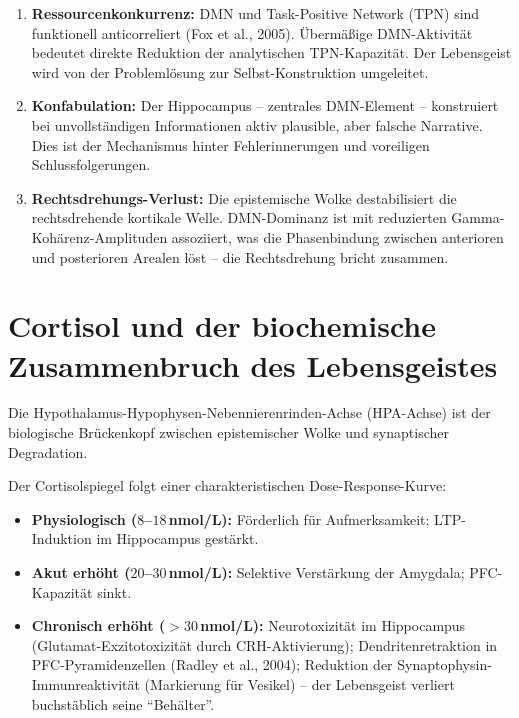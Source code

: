 ﻿\documentclass[12pt,a4paper]{report}
\theoremstyle{plain}
\theoremstyle{definition}
\theoremstyle{remark}
\begin{document}
	\begin{enumerate}[label=\arabic*., leftmargin=1.6cm]
		\item \textbf{Ressourcenkonkurrenz:} DMN und Task-Positive Network (TPN)
		sind funktionell anticorreliert (Fox et al., 2005).
		Übermä\ss{}ige DMN-Aktivität bedeutet direkte Reduktion
		der analytischen TPN-Kapazität. Der Lebensgeist wird von der
		Problemlösung zur Selbst-Konstruktion umgeleitet.
		\item \textbf{Konfabulation:} Der Hippocampus -- zentrales DMN-Element --
		konstruiert bei unvollständigen Informationen aktiv plausible,
		aber falsche Narrative. Dies ist der Mechanismus hinter
		Fehlerinnerungen und voreiligen Schlussfolgerungen.
		\item \textbf{Rechtsdrehungs-Verlust:} Die epistemische Wolke destabilisiert
		die rechtsdrehende kortikale Welle. DMN-Dominanz ist mit reduzierten
		Gamma-Kohärenz-Amplituden assoziiert, was die Phasenbindung
		zwischen anterioren und posterioren Arealen löst --
		die Rechtsdrehung bricht zusammen.
	\end{enumerate}
	
	\section{Cortisol und der biochemische Zusammenbruch des Lebensgeistes}
	
	Die Hypothalamus-Hypophysen-Nebennierenrinden-Achse (HPA-Achse) ist
	der biologische Brückenkopf zwischen epistemischer Wolke und
	synaptischer Degradation.
	
	Der Cortisolspiegel folgt einer charakteristischen Dose-Response-Kurve:
	\begin{itemize}
		\item \textbf{Physiologisch ($8$--$18$\,nmol/L):} Förderlich für
		Aufmerksamkeit; LTP-Induktion im Hippocampus gestärkt.
		\item \textbf{Akut erhöht ($20$--$30$\,nmol/L):} Selektive
		Verstärkung der Amygdala; PFC-Kapa\-zität sinkt.
		\item \textbf{Chronisch erhöht ($>30$\,nmol/L):} Neurotoxizität
		im Hippocampus (Glutamat-Exzitotoxizität durch CRH-Aktivierung);
		Dendritenretraktion in PFC-Pyramidenzel\-len (Radley et al., 2004);
		Reduktion der Synaptophysin-Immunreaktivität (Markierung für
		Vesikel) -- der Lebensgeist verliert buchstäblich seine
		``Behälter''.
	\end{itemize}

\end{document}

